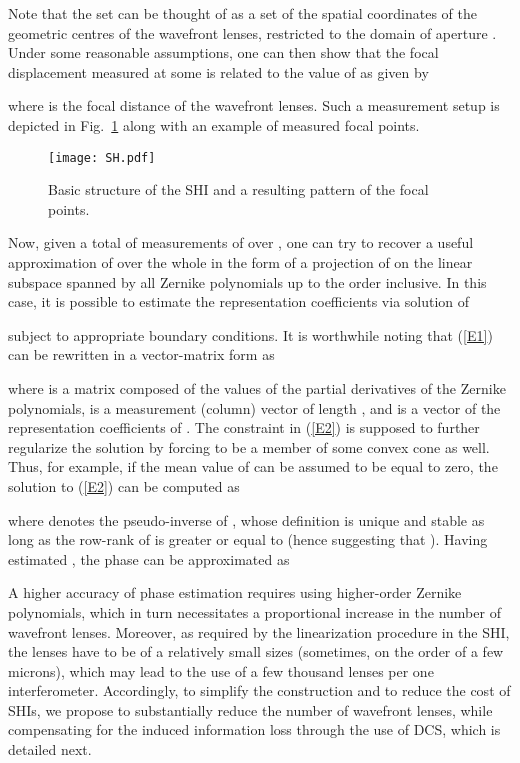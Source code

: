 \pdfoutput=1 \documentclass[journal]{IEEEtran}
\begin{document}
Note that the set  can be thought of as a set of the spatial coordinates of the geometric centres of the wavefront lenses, restricted to the domain of aperture . Under some reasonable assumptions, one can then show \cite{19} that the focal displacement  measured at some  is related to the value of  as given by

where  is the focal distance of the wavefront lenses. Such a measurement setup is depicted in Fig.~\ref{fig222} along with an example of measured focal points.

\begin{figure}[!t]
\centering
\texttt{[image: SH.pdf]}
\label{fig:tabsubfig21}
\caption{Basic structure of the SHI and a resulting pattern of the focal points.}
\label{fig222}
\end{figure}

Now, given a total of  measurements of  over , one can try to recover a useful approximation of  over the whole  in the form of a projection of  on the linear subspace spanned by all Zernike polynomials up to the order  inclusive. In this case, it is possible to estimate the representation coefficients  via solution of

subject to appropriate boundary conditions. It is worthwhile noting that (\ref{E1}) can be rewritten in a vector-matrix form as

where  is a  matrix composed of the values of the partial derivatives of the Zernike polynomials,  is a measurement (column) vector of length , and  is a vector of the representation coefficients of . The constraint  in (\ref{E2}) is supposed to further regularize the solution by forcing  to be  a member of some convex cone as well. Thus, for example, if the mean value of  can be assumed to be equal to zero, the solution to (\ref{E2}) can be computed as

where  denotes the pseudo-inverse of , whose definition is unique and stable as long as the row-rank of  is greater or equal to  (hence suggesting that ). Having estimated , the phase  can be approximated as


A higher accuracy of phase estimation requires using higher-order Zernike polynomials, which in turn necessitates a proportional increase in the number of wavefront lenses. Moreover, as required by the linearization procedure in the SHI, the lenses have to be of a relatively small sizes (sometimes, on the order of a few microns), which may lead to the use of a few thousand lenses per one interferometer. Accordingly, to simplify the construction and to reduce the cost of SHIs, we propose to substantially reduce the number of wavefront lenses, while compensating for the induced information loss through the use of DCS, which is detailed next.
\end{document}
